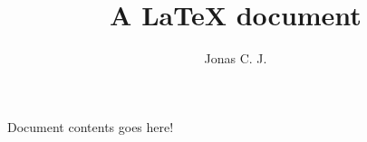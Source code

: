 \documentclass[a4paper, 12pt]{article}
\title{A \LaTeX{} document}
\author{Jonas C. J.}
\begin{document}
\maketitle
Document contents goes here!
\end{document}
